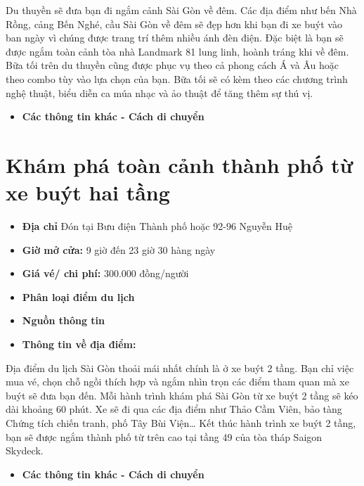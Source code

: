 \documentclass{article}
\begin{document}
Du thuyền sẽ đưa bạn đi ngắm cảnh Sài Gòn về đêm. Các địa điểm như bến Nhà Rồng, cảng Bến Nghé, cầu Sài Gòn về đêm sẽ đẹp hơn khi bạn đi xe buýt vào ban ngày vì chúng được trang trí thêm nhiều ánh đèn điện. Đặc biệt là bạn sẽ được ngắm toàn cảnh tòa nhà Landmark 81 lung linh, hoành tráng khi về đêm. Bữa tối trên du thuyền cũng được phục vụ theo cả phong cách Á và Âu hoặc theo combo tùy vào lựa chọn của bạn. Bữa tối sẽ có kèm theo các chương trình nghệ thuật, biểu diễn ca múa nhạc và ảo thuật để tăng thêm sự thú vị.

\begin{itemize}
    \item{\textbf{Các thông tin khác - Cách di chuyển}}
\end{itemize}

\section{Khám phá toàn cảnh thành phố từ xe buýt hai tầng}
\begin{itemize}
    \item{\textbf{Địa chỉ}} Đón tại Bưu điện Thành phố hoặc 92-96 Nguyễn Huệ
    \item{\textbf{Giờ mở cửa:}} 9 giờ đến 23 giờ 30 hàng ngày
    \item{\textbf{Giá vé/ chi phí:}} 300.000 đồng/người
    \item{\textbf{Phân loại điểm du lịch} }
    \item{\textbf{Nguồn thông tin}}
    \item{\textbf{Thông tin về địa điểm:}}
\end{itemize}

Địa điểm du lịch Sài Gòn thoải mái nhất chính là ở xe buýt 2 tầng. Bạn chỉ việc mua vé, chọn chỗ ngồi thích hợp và ngắm nhìn trọn các điểm tham quan mà xe buýt sẽ đưa bạn đến. Mỗi hành trình khám phá Sài Gòn từ xe buýt 2 tầng sẽ kéo dài khoảng 60 phút. Xe sẽ đi qua các địa điểm như Thảo Cầm Viên, bảo tàng Chứng tích chiến tranh, phố Tây Bùi Viện… Kết thúc hành trình xe buýt 2 tầng, bạn sẽ được ngắm thành phố từ trên cao tại tầng 49 của tòa tháp Saigon Skydeck.

\begin{itemize}
    \item{\textbf{Các thông tin khác - Cách di chuyển}}
\end{itemize}
\end{document}

